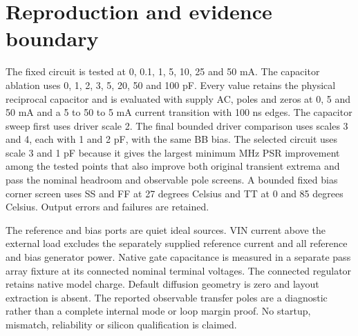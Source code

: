 \documentclass{article}
\begin{document}
\section*{Reproduction and evidence boundary}
The fixed circuit is tested at 0, 0.1, 1, 5, 10, 25 and 50 mA. The
capacitor ablation uses 0, 1, 2, 3, 5, 20, 50 and 100 pF. Every value
retains the physical reciprocal capacitor and is evaluated with supply
AC, poles and zeros at 0, 5 and 50 mA and a 5 to 50 to 5 mA current
transition with 100 ns edges. The capacitor sweep first uses driver
scale 2. The final bounded driver comparison uses scales 3 and 4, each
with 1 and 2 pF, with the same BB bias. The selected circuit uses scale 3
and 1 pF because it gives the largest minimum MHz PSR improvement among
the tested points that also improve both original transient extrema
and pass the nominal headroom and observable pole screens. A bounded fixed bias
corner screen uses SS and FF at 27 degrees Celsius and TT at 0 and
85 degrees Celsius. Output errors and failures are retained.

The reference and bias ports are quiet ideal sources. VIN current above
the external load excludes the separately supplied reference current
and all reference and bias generator power. Native gate capacitance is
measured in a separate pass array fixture at its connected nominal
terminal voltages. The connected regulator retains native model charge.
Default diffusion geometry is zero and layout extraction is absent.
The reported observable transfer poles are a diagnostic rather than a
complete internal mode or loop margin proof. No startup, mismatch,
reliability or silicon qualification is claimed.
\end{document}
